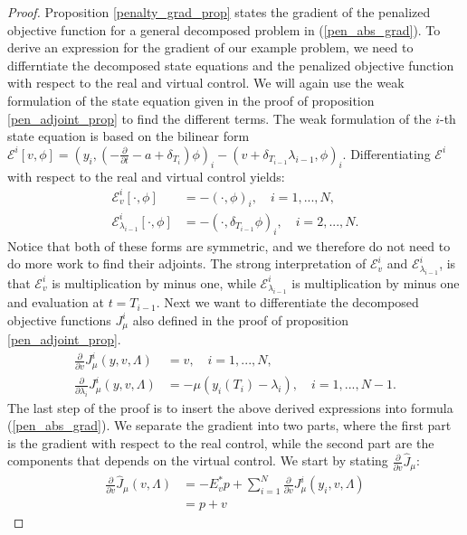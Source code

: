 \begin{proof}
Proposition \ref{penalty_grad_prop} states the gradient of the penalized objective function for a general decomposed problem in (\ref{pen_abs_grad}). To derive an expression for the gradient of our example problem, we need to differntiate the decomposed state equations and the penalized objective function with respect to the real and virtual control. We will again use the weak formulation of the state equation given in the proof of proposition \ref{pen_adjoint_prop} to find the different terms. The weak formulation of the $i$-th state equation is based on the bilinear form $\mathcal{E}^i[v,\phi]=(y_i,(-\frac{\partial}{\partial t}-a+\delta_{T_i})\phi)_i - (v+\delta_{T_{i-1}}\lambda_{i-1},\phi)_i$. Differentiating $\mathcal{E}^i$ with respect to the real and virtual control yields:
\begin{align*}
\mathcal{E}_v^i[\cdot,\phi] &= -(\cdot,\phi)_i, \quad i=1,...,N,\\
\mathcal{E}_{\lambda_{i-1}}^i[\cdot,\phi] &= -(\cdot,\delta_{T_{i-1}}\phi)_i,\quad i=2,...,N.
\end{align*}
Notice that both of these forms are symmetric, and we therefore do not need to do more work to find their adjoints. The strong interpretation of $\mathcal{E}_v^i$ and $\mathcal{E}_{\lambda_{i-1}}^i$, is that $\mathcal{E}_v^i$ is multiplication by minus one, while $\mathcal{E}_{\lambda_{i-1}}^i$ is multiplication by minus one and evaluation at $t=T_{i-1}$. Next we want to differentiate the decomposed objective functions $J_{\mu}^i$ also defined in the proof of proposition \ref{pen_adjoint_prop}.
\begin{align*}
\frac{\partial}{\partial v} J_{\mu}^i(y,v,\Lambda) &= v,\quad i=1,...,N, \\
\frac{\partial}{\partial \lambda_i}J_{\mu}^i(y,v,\Lambda) &= - \mu (y_{i}(T_i)-\lambda_i),\quad i=1,...,N-1.
\end{align*}
The last step of the proof is to insert the above derived expressions into formula (\ref{pen_abs_grad}). We separate the gradient into two parts, where the first part is the gradient with respect to the real control, while the second part are the components that depends on the virtual control. We start by stating $\frac{\partial}{\partial v} \hat J_{\mu}$:
\begin{align*}
\frac{\partial}{\partial v} \hat J_{\mu}(v,\Lambda) &= -E_v^*p +  \sum_{i=1}^N\frac{\partial}{\partial v} J_{\mu}^i(y_i,v,\Lambda) \\
&=p+v
\end{align*}

\end{proof}
